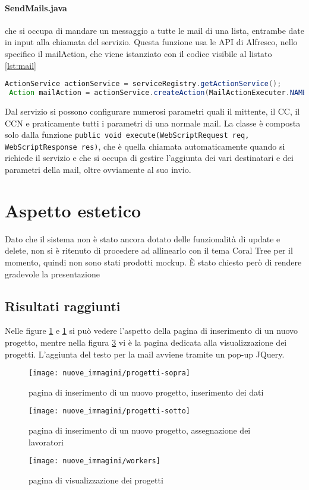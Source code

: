 \paragraph{SendMails.java} che si occupa di mandare un messaggio a tutte le mail di una lista, entrambe date in input alla chiamata del servizio. Questa funzione usa le API di Alfresco, nello specifico il mailAction, che viene istanziato con il codice visibile al listato \ref{lst:mail}
\begin{lstlisting}[language=Java,caption=set dell'actionservice per le mail,label=lst:mail]
 ActionService actionService = serviceRegistry.getActionService();
 Action mailAction = actionService.createAction(MailActionExecuter.NAME);
\end{lstlisting}
Dal servizio si possono configurare numerosi parametri quali il mittente, il CC, il CCN e praticamente tutti i parametri di una normale mail.
La classe è composta solo dalla funzione \texttt{public void execute(WebScriptRequest req, WebScriptResponse res)}, che è quella chiamata automaticamente quando si richiede il servizio e che si occupa di gestire l'aggiunta dei vari destinatari e dei parametri della mail, oltre ovviamente al suo invio.
\section{Aspetto estetico}
Dato che il sistema non è stato ancora dotato delle funzionalità di update e delete, non si è ritenuto di procedere ad allinearlo con il tema Coral Tree per il momento, quindi non sono stati prodotti mockup. È stato chiesto però di rendere gradevole la presentazione
\subsection{Risultati raggiunti}
Nelle figure \ref{fig:progetti-sopra} e \ref{fig:progetti-sopra} si può vedere l'aspetto della pagina di inserimento di un nuovo progetto, mentre nella figura \ref{fig:workers} vi è la pagina dedicata alla visualizzazione dei progetti. L'aggiunta del testo per la mail avviene tramite un pop-up JQuery.
\begin{figure}[!ht]
\centering
\texttt{[image: nuove\_immagini/progetti-sopra]}
\caption{pagina di inserimento di un nuovo progetto, inserimento dei dati\label{fig:progetti-sopra}}
\end{figure}
\begin{figure}[!ht]
\centering
\texttt{[image: nuove\_immagini/progetti-sotto]}
\caption{pagina di inserimento di un nuovo progetto, assegnazione dei lavoratori \label{fig:progetti-sotto}}
\end{figure}
\begin{figure}[!ht]
\centering
\texttt{[image: nuove\_immagini/workers]}
\caption{pagina di visualizzazione dei progetti \label{fig:workers}}
\end{figure}